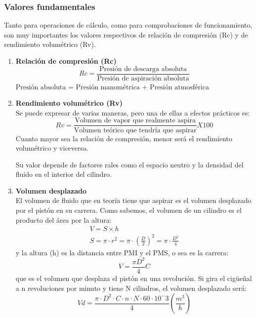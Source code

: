 \subsubsection{Valores fundamentales}
Tanto para operaciones de c\'alculo, como para comprobaciones de funcionamiento, son muy importantes los valores respectivos de relaci\'on de compresi\'on (Rc) y de rendimiento volum\'etrico (Rv).
\begin{enumerate}[1.]
	\item \textbf{Relaci\'on de compresi\'on (Rc)}
	\begin{equation*}
		Rc = \dfrac{\text{Presi\'on de descarga absoluta}}{\text{Presi\'on de aspiraci\'on absoluta}}
	\end{equation*}
	$\text{Presi\'on absoluta = Presi\'on manom\'etrica + Presi\'on atmosf\'erica}$
	\item \textbf{Rendimiento volum\'etrico (Rv)}\\ Se puede expresar de varias maneras, pero una de ellas a efectos pr\'acticos es:
	\begin{equation*}
		Rv = {\frac{\text{Volumen de vapor que realmente aspira}}{\text{Volumen te\'orico que tendr\'ia que aspirar}}X 100}
	\end{equation*}
	Cuanto mayor sea la relaci\'on de compresi\'on, menor ser\'a el rendimiento volum\'etrico y viceversa.

	Su valor depende de factores rales como el espacio neutro y la densidad del fluido en el interior del cilindro.
	\item \textbf{Volumen desplazado}\\ El volumen de fluido que en teor\'ia tiene que aspirar es el volumen desplazado por el pist\'on en su carrera. Como sabemos, el volumen de un cilindro es el producto del \'area por la altura:
	\begin{gather*}
		V = S \times h\\ 
		S = \pi\cdot r^2 = \pi\cdot(\frac{D}{2})^2 = \pi\cdot\frac{D^2}{4}
	\end{gather*}
	y la altura (h) es la distancia entre PMI y el PMS, o sea es la carrera:
	\begin{equation*}
		V = \frac{\pi D^2}{4}C
	\end{equation*}
	que es el volumen que desplaza el pist\'on en una revoluci\'on. Si gira el cig\"ue\~{n}al a n revoluciones por minuto y tiene N cilindros, el volumen desplazado ser\'a:
	\begin{equation*}
		Vd = \frac{\pi\cdot D^2\cdot C\cdot n\cdot N\cdot 60\cdot 10^-3}{4}(\frac{m^3}{h})
	\end{equation*}
\end{enumerate}
